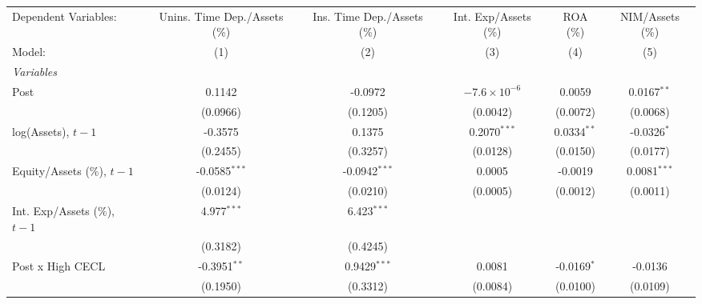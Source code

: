 
\begingroup
\centering
\begin{tabular}{lccccc}
   \tabularnewline \midrule \midrule
   Dependent Variables:                                   & Unins. Time Dep./Assets (\%)  & Ins. Time Dep./Assets (\%)  & Int. Exp/Assets (\%)  & ROA (\%)       & NIM/Assets (\%)\\   
   Model:                                                 & (1)                           & (2)                         & (3)                   & (4)            & (5)\\  
   \midrule
   \emph{Variables}\\
   Post                                                   & 0.1142                        & -0.0972                     & $-7.6\times 10^{-6}$  & 0.0059         & 0.0167$^{**}$\\   
                                                          & (0.0966)                      & (0.1205)                    & (0.0042)              & (0.0072)       & (0.0068)\\   
   log(Assets), $t{-}1$                                   & -0.3575                       & 0.1375                      & 0.2070$^{***}$        & 0.0334$^{**}$  & -0.0326$^{*}$\\   
                                                          & (0.2455)                      & (0.3257)                    & (0.0128)              & (0.0150)       & (0.0177)\\   
   Equity/Assets (\%), $t{-}1$                            & -0.0585$^{***}$               & -0.0942$^{***}$             & 0.0005                & -0.0019        & 0.0081$^{***}$\\   
                                                          & (0.0124)                      & (0.0210)                    & (0.0005)              & (0.0012)       & (0.0011)\\   
   Int. Exp/Assets (\%), $t{-}1$                          & 4.977$^{***}$                 & 6.423$^{***}$               &                       &                &   \\   
                                                          & (0.3182)                      & (0.4245)                    &                       &                &   \\   
   Post x High CECL                                       & -0.3951$^{**}$                & 0.9429$^{***}$              & 0.0081                & -0.0169$^{*}$  & -0.0136\\   
                                                          & (0.1950)                      & (0.3312)                    & (0.0084)              & (0.0100)       & (0.0109)\\   

\end{tabular}
